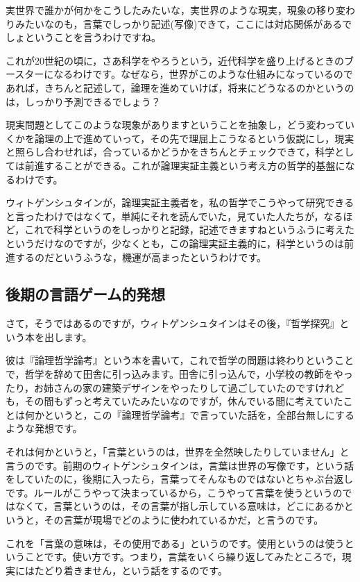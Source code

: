 \documentclass{ltjsbook}
\begin{document}
実世界で誰かが何かをこうしたみたいな，実世界のような現実，現象の移り変わりみたいなのも，言葉でしっかり記述(写像)できて，ここには対応関係があるでしょということを言うわけですね。

これが20世紀の頃に，さあ科学をやろうという，近代科学を盛り上げるときのブースターになるわけです。なぜなら，世界がこのような仕組みになっているのであれば，きちんと記述して，論理を進めていけば，将来にどうなるのかというのは，しっかり予測できるでしょう？

現実問題としてこのような現象がありますということを抽象し，どう変わっていくかを論理の上で進めていって，その先で理屈上こうなるという仮説にし，現実と照らし合わせれば，合っているかどうかをきちんとチェックできて，科学としては前進することができる。これが論理実証主義という考え方の哲学的基盤になるわけです。

ウィトゲンシュタインが，論理実証主義者を，私の哲学でこうやって研究できると言ったわけではなくて，単純にそれを読んでいた，見ていた人たちが，なるほど，これで科学というのをしっかりと記録，記述できますねというふうに考えたというだけなのですが，少なくとも，この論理実証主義的に，科学というのは前進するのだというふうな，機運が高まったというわけです。

\subsection{後期の言語ゲーム的発想}
さて，そうではあるのですが，ウィトゲンシュタインはその後，『哲学探究』という本を出します。

彼は『論理哲学論考』という本を書いて，これで哲学の問題は終わりということで，哲学を辞めて田舎に引っ込みます。田舎に引っ込んで，小学校の教師をやったり，お姉さんの家の建築デザインをやったりして過ごしていたのですけれども，その間もずっと考えていたみたいなのですが，休んでいる間に考えていたことは何かというと，この『論理哲学論考』で言っていた話を，全部台無しにするような発想です。

それは何かというと，「言葉というのは，世界を全然映したりしていません」と言うのです。前期のウィトゲンシュタインは，言葉は世界の写像です，という話をしていたのに，後期に入ったら，言葉ってそんなものではないとちゃぶ台返しです。ルールがこうやって決まっているから，こうやって言葉を使うというのではなくて，言葉というのは，その言葉が指し示している意味は，どこにあるかというと，その言葉が現場でどのように使われているかだ，と言うのです。

これを「言葉の意味は，その使用である」というのです。使用というのは使うということです。使い方です。つまり，言葉をいくら繰り返してみたところで，現実にはたどり着きません，という話をするのです。
\end{document}
